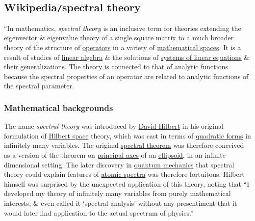 \documentclass{article}
\begin{document}

\subsection{Wikipedia{\tt/}spectral theory}
``In mathematics, {\it spectral theory} is an inclusive term for theories extending the \href{https://en.wikipedia.org/wiki/Eigenvector}{eigenvector} \& \href{https://en.wikipedia.org/wiki/Eigenvalue}{eigenvalue} theory of a single \href{https://en.wikipedia.org/wiki/Square_matrix}{square matrix} to a much broader theory of the structure of \href{https://en.wikipedia.org/wiki/Operator_(mathematics)}{operators} in a variety of \href{https://en.wikipedia.org/wiki/Mathematical_space}{mathematical spaces}. It is a result of studies of \href{https://en.wikipedia.org/wiki/Linear_algebra}{linear algebra} \& the solutions of \href{https://en.wikipedia.org/wiki/System_of_linear_equations}{systems of linear equations} \& their generalizations. The theory is connected to that of \href{https://en.wikipedia.org/wiki/Analytic_functions}{analytic functions} because the spectral properties of an operator are related to analytic functions of the spectral parameter.

\subsubsection{Mathematical backgrounds}
The name {\it spectral theory} was introduced by \href{https://en.wikipedia.org/wiki/David_Hilbert}{\sc David Hilbert} in his original formulation of \href{https://en.wikipedia.org/wiki/Hilbert_space}{Hilbert space} theory, which was cast in terms of \href{https://en.wikipedia.org/wiki/Quadratic_form}{quadratic forms} in infinitely many variables. The original \href{https://en.wikipedia.org/wiki/Spectral_theorem}{spectral theorem} was therefore conceived as a version of the theorem on \href{https://en.wikipedia.org/wiki/Principal_axis_theorem}{principal axes} of an \href{https://en.wikipedia.org/wiki/Ellipsoid}{ellipsoid}, in an infinite-dimensional setting. The later discovery in \href{https://en.wikipedia.org/wiki/Quantum_mechanics}{quantum mechanics} that spectral theory could explain features of \href{https://en.wikipedia.org/wiki/Emission_spectrum}{atomic spectra} was therefore fortuitous. {\sc Hilbert} himself was surprised by the unexpected application of this theory, noting that ``I developed my theory of infinitely many variables from purely mathematical interests, \& even called it `spectral analysis' without any presentiment that it would later find application to the actual spectrum of physics.''
\end{document}
